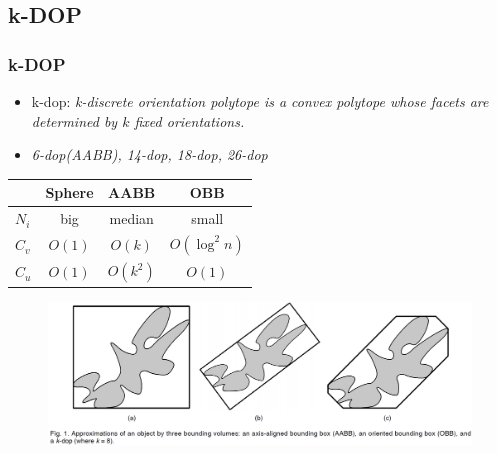 \documentclass{beamer}
\begin{document}
\subsection{k-DOP}
	\begin{frame}
	\frametitle{k-DOP}
		\begin{itemize}
			\item k-dop: \it{k-discrete orientation polytope} is a convex polytope whose facets are determined by $k$ \it{fixed} orientations.
			\item \it{6-dop}(AABB), \it{14-dop}, \it{18-dop}, \it{26-dop}
		\end{itemize}
		\begin{center}
			\begin{tabular}{l || c | c | c}
					& Sphere & AABB & OBB \\
				\hline
				$N_{i}$ & big & median & small\\ 
				$C_{v}$ & $O(1)$ & $O(k)$ & $O(\log^{2}n)$\\
				$C_{u}$ & $O(1)$ & $O(k^{2})$ & $O(1)$\\
			\end{tabular}
		\end{center}
	\end{frame}
	
	\begin{frame}
		\begin{figure}[h!]
			\centering
			\includegraphics[width=1.0\textwidth]{./figure/kDOPs.PNG}
		\end{figure}
	\end{frame}

\end{document}
